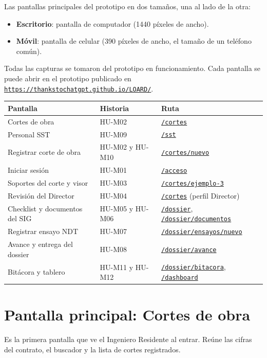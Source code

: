\documentclass[11pt]{article}
\newcommand{\urlapp}{https://thankstochatgpt.github.io/LOARD}
\newcommand{\app}[1]{\href{\urlapp#1}{\texttt{#1}}}
\begin{document}
Las pantallas principales del prototipo en dos tamaños, una al lado de la otra:

\begin{itemize}
  \item \textbf{Escritorio}: pantalla de computador (1440 píxeles de ancho).
  \item \textbf{Móvil}: pantalla de celular (390 píxeles de ancho, el tamaño de un teléfono común).
\end{itemize}

Todas las capturas se tomaron del prototipo en funcionamiento. Cada pantalla se puede abrir en el prototipo publicado en \href{\urlapp/}{\nolinkurl{https://thankstochatgpt.github.io/LOARD/}}.
\begin{center}
\begin{tabular}{|>{\raggedright\arraybackslash}m{5.4cm}|>{\raggedright\arraybackslash}m{3.4cm}|>{\raggedright\arraybackslash}m{6.6cm}|}
\hline
\rowcolor{barra}
\textbf{Pantalla} & \textbf{Historia} & \textbf{Ruta} \\ \hline
Cortes de obra & HU-M02 & \app{/cortes} \\ \hline
Personal SST & HU-M09 & \app{/sst} \\ \hline
Registrar corte de obra & HU-M02 y HU-M10 & \app{/cortes/nuevo} \\ \hline
Iniciar sesión & HU-M01 & \app{/acceso} \\ \hline
Soportes del corte y visor & HU-M03 & \app{/cortes/ejemplo-3} \\ \hline
Revisión del Director & HU-M04 & \app{/cortes} (perfil Director) \\ \hline
Checklist y documentos del SIG & HU-M05 y HU-M06 & \app{/dossier}, \app{/dossier/documentos} \\ \hline
Registrar ensayo NDT & HU-M07 & \app{/dossier/ensayos/nuevo} \\ \hline
Avance y entrega del dossier & HU-M08 & \app{/dossier/avance} \\ \hline
Bitácora y tablero & HU-M11 y HU-M12 & \app{/dossier/bitacora}, \app{/dashboard} \\ \hline
\end{tabular}
\end{center}

\newpage
\section{Pantalla principal: Cortes de obra}

Es la primera pantalla que ve el Ingeniero Residente al entrar. Reúne las cifras del contrato, el buscador y la lista de cortes registrados.
\end{document}
